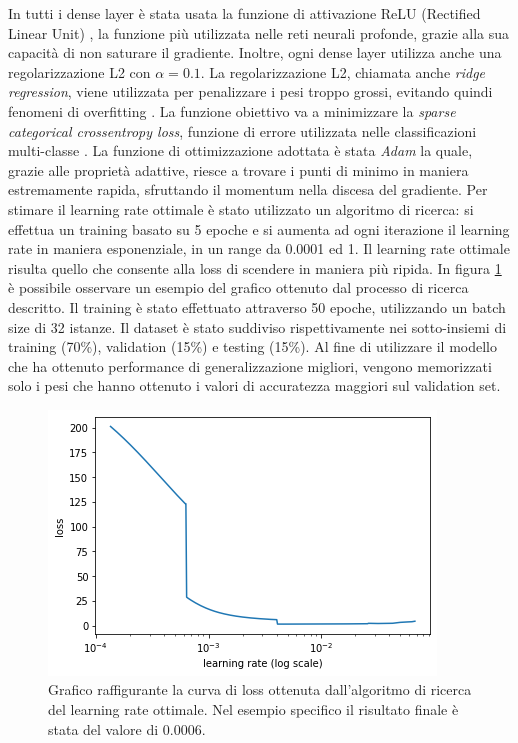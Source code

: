 \documentclass[11pt]{report}
\begin{document}
In tutti i dense layer è stata usata la funzione di attivazione ReLU (Rectified Linear Unit) \cite{relu}, la funzione più utilizzata nelle reti neurali profonde, grazie alla sua capacità di non saturare il gradiente. Inoltre, ogni dense layer utilizza anche una regolarizzazione L2 con $\alpha = 0.1$. La regolarizzazione L2, chiamata anche \textit{ridge regression}, viene utilizzata per penalizzare i pesi troppo grossi, evitando quindi fenomeni di overfitting \cite{l1l2}. La funzione obiettivo va a minimizzare la \textit{sparse categorical crossentropy loss}, funzione di errore utilizzata nelle classificazioni multi-classe \cite{loss}.
La funzione di ottimizzazione adottata è stata \textit{Adam} \cite{kingma2014adam} la quale, grazie alle proprietà adattive, riesce a trovare i punti di minimo in maniera estremamente rapida, sfruttando il momentum nella discesa del gradiente. Per stimare il learning rate ottimale è stato utilizzato un algoritmo di ricerca: si effettua un training basato su 5 epoche e si aumenta ad ogni iterazione il learning rate in maniera esponenziale, in un range da 0.0001 ed 1. Il learning rate ottimale risulta quello che consente alla loss di scendere in maniera più ripida. In figura \ref{fig:lr-find} è possibile osservare un esempio del grafico ottenuto dal processo di ricerca descritto. Il training è stato effettuato attraverso 50 epoche, utilizzando un batch size di 32 istanze. Il dataset è stato suddiviso rispettivamente nei sotto-insiemi di training (70\%), validation (15\%) e testing (15\%). Al fine di utilizzare il modello che ha ottenuto performance di generalizzazione migliori, vengono memorizzati solo i pesi che hanno ottenuto i valori di accuratezza maggiori sul validation set. 



\begin{figure}[h]
    \centering
    \includegraphics[scale=0.65]{img/lr-finder.png}
    \caption{Grafico raffigurante la curva di loss ottenuta dall'algoritmo di ricerca del learning rate ottimale. Nel esempio specifico il risultato finale è stata del valore di 0.0006.}
    \label{fig:lr-find}
\end{figure}
\end{document}
